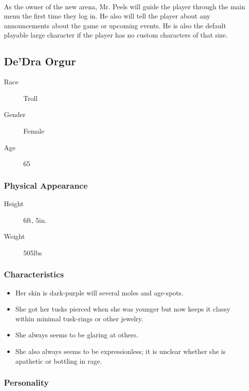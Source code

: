 \paragraph{} As the owner of the new arena, Mr. Peels will guide the player through the main menu the first time they log in. He also will tell the player about any announcements about the game or upcoming events. He is also the default playable large character if the player has no custom characters of that size.

\subsection{De'Dra Orgur}

\begin{description}
    \item[Race] Troll
    \item[Gender] Female
    \item[Age] 65  
\end{description}

\subsubsection{Physical Appearance}

\begin{description}
    \item[Height] 6ft, 5in.
    \item[Weight] 505lbs
\end{description}

\subsubsection{Characteristics}

\begin{itemize}
    \item Her skin is dark-purple will several moles and age-spots.
    \item She got her tusks pierced when she was younger but now keeps it classy within minimal tusk-rings or other jewelry.
    \item She always seems to be glaring at others.
    \item She also always seems to be expressionless; it is unclear whether she is apathetic or bottling in rage.
\end{itemize}

\subsubsection{Personality}

